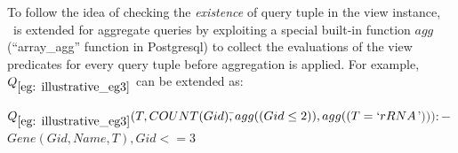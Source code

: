 \begin{example}


To follow the idea of checking the {\em existence} of query tuple in the view instance, \rba\ is extended for aggregate queries by exploiting a special built-in function $agg$ (``array\_agg'' function in Postgresql) to collect the evaluations of the view predicates for every query tuple before aggregation is applied. For example, $Q_{\ref{eg: illustrative_eg3}}$ can be extended as:
\begin{tabbing}
$Q_{\ref{eg: illustrative_eg3}}(T, COUNT(Gid), $\hspace{0.1em}\=$ agg((Gid \leq 2)), agg((T = `rRNA$'$))):-$\\
\>$Gene(Gid, Name, T),Gid <= 3$
\end{tabbing}


\end{example}
